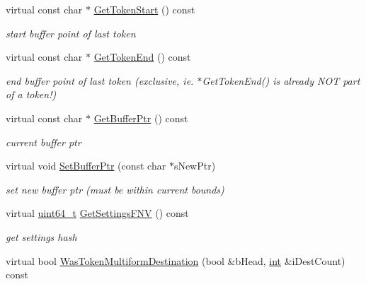 \begin{DoxyCompactItemize}
virtual const char $\ast$ \hyperlink{classCSphMultiformTokenizer_abbd9f84c42f66c8941b965a3247b127a}{Get\-Token\-Start} () const 
\begin{DoxyCompactList}\small\item\em start buffer point of last token \end{DoxyCompactList}\item 
virtual const char $\ast$ \hyperlink{classCSphMultiformTokenizer_ab5dcded14ce70e108a35654bfdff4e80}{Get\-Token\-End} () const 
\begin{DoxyCompactList}\small\item\em end buffer point of last token (exclusive, ie. $\ast$\-Get\-Token\-End() is already N\-O\-T part of a token!) \end{DoxyCompactList}\item 
virtual const char $\ast$ \hyperlink{classCSphMultiformTokenizer_a04e313439fbe030fc974d0939d1be421}{Get\-Buffer\-Ptr} () const 
\begin{DoxyCompactList}\small\item\em current buffer ptr \end{DoxyCompactList}\item 
virtual void \hyperlink{classCSphMultiformTokenizer_a990185ca2f615cea970a625817cf16bb}{Set\-Buffer\-Ptr} (const char $\ast$s\-New\-Ptr)
\begin{DoxyCompactList}\small\item\em set new buffer ptr (must be within current bounds) \end{DoxyCompactList}\item 
virtual \hyperlink{sphinxstd_8h_aaa5d1cd013383c889537491c3cfd9aad}{uint64\-\_\-t} \hyperlink{classCSphMultiformTokenizer_a3430ee0f98e5f9d13f9b5ad8f46c57f5}{Get\-Settings\-F\-N\-V} () const 
\begin{DoxyCompactList}\small\item\em get settings hash \end{DoxyCompactList}\item 
virtual bool \hyperlink{classCSphMultiformTokenizer_a25e08fa1dc7663ec49d1fa4622d1541b}{Was\-Token\-Multiform\-Destination} (bool \&b\-Head, \hyperlink{sphinxexpr_8cpp_a4a26e8f9cb8b736e0c4cbf4d16de985e}{int} \&i\-Dest\-Count) const 
\end{DoxyCompactItemize}
